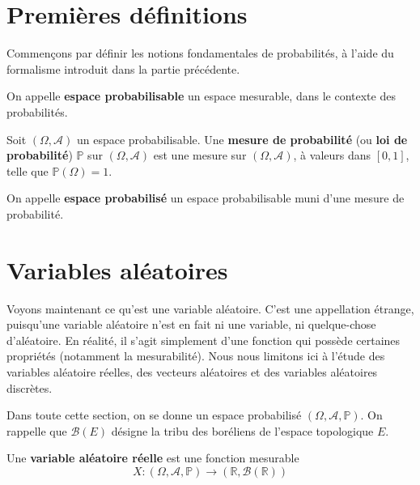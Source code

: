 \documentclass[../integ-proba.tex]{subfiles}
\begin{document}
\section{Premières définitions}

Commençons par définir les notions fondamentales de probabilités, à l'aide du formalisme introduit dans la partie précédente.

\begin{defi}
    On appelle \textbf{espace probabilisable} un espace mesurable, dans le contexte des probabilités.
\end{defi}

\begin{defi}
    Soit $\left(\Omega, \mathcal{A}\right)$ un espace probabilisable.
    Une \textbf{mesure de probabilité} (ou \textbf{loi de probabilité}) $\mathbb{P}$ sur $\left(\Omega, \mathcal{A}\right)$ est une mesure sur $\left(\Omega, \mathcal{A}\right)$, à valeurs dans $\left[0,1\right]$, telle que $\mathbb{P}\left(\Omega\right)=1$.
\end{defi}

\begin{defi}
    On appelle \textbf{espace probabilisé} un espace probabilisable muni d'une mesure de probabilité.
\end{defi}

\section{Variables aléatoires}

Voyons maintenant ce qu'est une variable aléatoire.
C'est une appellation étrange, puisqu'une variable aléatoire n'est en fait ni une variable, ni quelque-chose d'aléatoire.
En réalité, il s'agit simplement d'une fonction qui possède certaines propriétés (notamment la mesurabilité).
Nous nous limitons ici à l'étude des variables aléatoire réelles, des vecteurs aléatoires et des variables aléatoires discrètes.

Dans toute cette section, on se donne un espace probabilisé $\left(\Omega, \mathcal{A}, \mathbb{P}\right)$.
On rappelle que $\mathcal{B}(E)$ désigne la tribu des boréliens de l'espace topologique $E$.

\begin{defi}
    Une \textbf{variable aléatoire réelle} est une fonction mesurable
    $$X:\left(\Omega, \mathcal{A}, \mathbb{P}\right) \longrightarrow \left(\mathbb{R}, \mathcal{B}(\mathbb{R})\right)$$
\end{defi}
\end{document}
